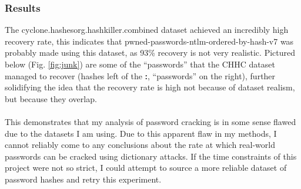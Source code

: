 \documentclass[11pt]{article}
\begin{document}
\subsubsection{Results}
\begin{center}
\end{center}
The cyclone.hashesorg.hashkiller.combined dataset achieved an incredibly high recovery rate, this indicates that pwned-passwords-ntlm-ordered-by-hash-v7 was probably made using this dataset, as 93\% recovery is not very realistic.
Pictured below (Fig. \ref{fig:junk}) are some of the ``passwords'' that the CHHC dataset managed to recover (hashes left of the \textbf{:}, ``passwords'' on the right), further solidifying the idea that the recovery rate is high not because of dataset realism, but because they overlap.\\\\
This demonstrates that my analysis of password cracking is in some sense flawed due to the datasets I am using.
Due to this apparent flaw in my methods, I cannot reliably come to any conclusions about the rate at which real-world passwords can be cracked using dictionary attacks.
If the time constraints of this project were not so strict, I could attempt to source a more reliable dataset of password hashes and retry this experiment.
\end{document}
